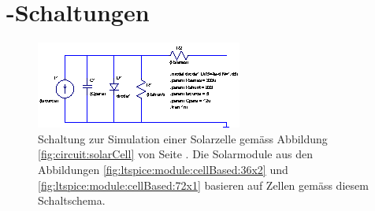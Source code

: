 \chapter{-Schaltungen}
\label{app:ltspice}


\begin{figure}[h!tb]
    \centering
    \includegraphics[width=\textwidth]{images/ltspice/singlecell.eps}
    \caption{%
        Schaltung        zur         Simulation        einer        Solarzelle
        gem\"ass        Abbildung       \ref{fig:circuit:solarCell}        von
        Seite     \pageref{fig:circuit:solarCell}. Die     Solarmodule     aus
        den     Abbildungen    \ref{fig:ltspice:module:cellBased:36x2}     und
        \ref{fig:ltspice:module:cellBased:72x1}  basieren auf  Zellen gem\"ass
        diesem Schaltschema.%
    }
    \label{fig:ltspice:solarCell}
\end{figure}

